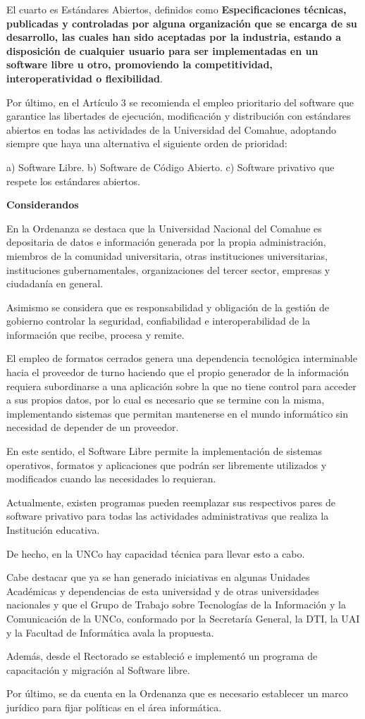 {El cuarto es Estándares Abiertos, definidos como \textbf{Especificaciones técnicas, publicadas y controladas por alguna organización que se encarga de su desarrollo, las cuales han sido aceptadas por la industria, estando a disposición de cualquier usuario para ser implementadas en un software libre u otro, promoviendo la competitividad, interoperatividad o flexibilidad}. 

Por último, en el Artículo 3 se recomienda el empleo prioritario del software que garantice las libertades de ejecución, modificación y distribución con estándares abiertos en todas las actividades de la Universidad del Comahue, adoptando siempre que haya una alternativa el siguiente orden de prioridad:

a) Software Libre.
b) Software de Código Abierto.
c) Software privativo que respete los estándares abiertos.


\textbf{Considerandos}

En la Ordenanza se destaca que la Universidad Nacional del Comahue es depositaria de datos e información generada por la propia administración, miembros de la comunidad universitaria, otras instituciones universitarias, instituciones gubernamentales, organizaciones del tercer sector, empresas y ciudadanía en general.

Asimismo se considera que es responsabilidad y obligación de la gestión de gobierno controlar la seguridad, confiabilidad e interoperabilidad de la información que recibe, procesa y remite.

El empleo de formatos cerrados genera una dependencia tecnológica interminable hacia el proveedor de turno haciendo que el propio generador de la información requiera subordinarse a una aplicación sobre la que no tiene control para acceder a sus propios datos, por lo cual es necesario que se termine con la misma, implementando sistemas que permitan mantenerse en el mundo informático sin necesidad de depender de un proveedor.

En este sentido, el Software Libre permite la implementación de sistemas operativos, formatos y aplicaciones que podrán ser libremente utilizados y modificados cuando las necesidades lo requieran.

Actualmente, existen programas  pueden reemplazar sus respectivos pares de software privativo para todas las actividades administrativas que realiza la Institución educativa.

De hecho, en la UNCo hay capacidad técnica para llevar esto a cabo.

Cabe destacar que ya se han generado iniciativas en algunas Unidades Académicas y dependencias de esta universidad y de otras universidades nacionales y que el Grupo de Trabajo sobre Tecnologías de la Información y la Comunicación de la UNCo, conformado por la Secretaría General, la DTI, la UAI y la Facultad de Informática avala la propuesta.

Además, desde el Rectorado se estableció e implementó un programa de capacitación y migración al Software libre.

Por último, se da cuenta en la Ordenanza que es necesario establecer un marco jurídico para fijar políticas en el área informática.

}